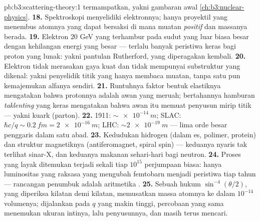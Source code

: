 \begin{solution}{pb:b3:scattering-theory:1}
termampatkan, yakni gambaran awal \cref{ch:b3:nuclear-physics}.
\textbf{18.} Spektroskopi menyelidiki elektronnya; hanya proyektil yang
menembus atomnya yang dapat bersaksi di mana muatan \emph{positif} dan
massanya berada.
\textbf{19.} Elektron $20$ GeV yang terhambur pada sudut yang luar biasa
besar dengan kehilangan energi yang besar --- terlalu banyak peristiwa
keras bagi proton yang lunak: yakni pantulan Rutherford, yang
diperagakan kembali.
\textbf{20.} Elektron tidak merasakan gaya kuat dan tidak mempunyai
substruktur yang dikenal: yakni penyelidik titik yang hanya membaca
muatan, tanpa satu pun kemajemukan alfanya sendiri.
\textbf{21.} Runtuhnya faktor bentuk elastiknya mengatakan bahwa
protonnya adalah awan yang meruah; bertahannya hamburan
\emph{taklenting} yang keras mengatakan bahwa awan itu memuat penyusun
mirip titik --- yakni kuark (parton).
\textbf{22.} 1911: $\sim\qty{e-14}{m}$; SLAC: $\hbar c/q \sim
\qty{0.2}{fm} = \qty{2e-16}{m}$; LHC: $\sim\qty{2e-19}{m}$ ---
lima orde besar penggaris dalam satu abad.
\textbf{23.} Kedudukan hidrogen (dalam es, polimer, protein) dan
struktur magnetiknya (antiferomagnet, spiral spin) --- keduanya nyaris
tak terlihat sinar-X, dan keduanya makanan sehari-hari bagi neutron.
\textbf{24.} Proses yang layak ditemukan terjadi sekali tiap
$10^{15}$ perjumpaan biasa: hanya luminositas yang raksasa yang mengubah
femtobarn menjadi peristiwa tiap tahun --- rancangan penumbuk adalah
aritmetika .
\textbf{25.} Sebuah hukum $\sin^{-4}(\theta/2)$, yang diperiksa kilatan
demi kilatan, memusatkan massa atomnya ke dalam $10^{-14}$ volumenya;
dijalankan pada $q$ yang makin tinggi, percobaan yang sama menemukan
ukuran intinya, lalu penyusunnya, dan masih terus mencari.
\end{solution}
